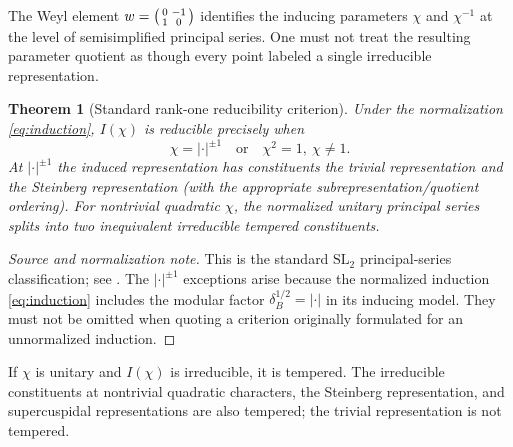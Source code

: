 \documentclass[12pt,letterpaper]{amsart}
\numberwithin{equation}{section}
\newtheorem{theorem}{Theorem}[section]
\theoremstyle{definition}
\theoremstyle{remark}
\begin{document}
The Weyl element $w=\begin{psmallmatrix}0&-1\\1&0\end{psmallmatrix}$ identifies the inducing parameters $\chi$ and $\chi^{-1}$ at the level of semisimplified principal series.  One must not treat the resulting parameter quotient as though every point labeled a single irreducible representation.

\begin{theorem}[Standard rank-one reducibility criterion]\label{thm:reducibility}
Under the normalization \eqref{eq:induction}, $I(\chi)$ is reducible precisely when
\begin{equation}\label{eq:reducibility}
\chi=|\cdot|^{\pm1}\quad\text{or}\quad \chi^2=1,\ \chi\ne1.
\end{equation}
At $|\cdot|^{\pm1}$ the induced representation has constituents the trivial representation and the Steinberg representation (with the appropriate subrepresentation/quotient ordering).  For nontrivial quadratic $\chi$, the normalized unitary principal series splits into two inequivalent irreducible tempered constituents.
\end{theorem}
\begin{proof}[Source and normalization note]
This is the standard $\mathrm{SL}_2$ principal-series classification; see \cite{GG63,Si79,Ca93}.  The $|\cdot|^{\pm1}$ exceptions arise because the normalized induction \eqref{eq:induction} includes the modular factor $\delta_B^{1/2}=|\cdot|$ in its inducing model.  They must not be omitted when quoting a criterion originally formulated for an unnormalized induction.
\end{proof}

If $\chi$ is unitary and $I(\chi)$ is irreducible, it is tempered. The irreducible constituents at nontrivial quadratic characters, the Steinberg representation, and supercuspidal representations are also tempered; the trivial representation is not tempered.
\end{document}
